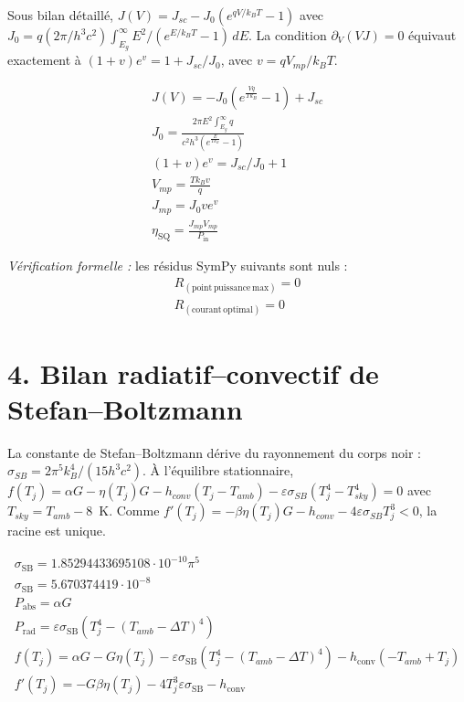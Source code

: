 \documentclass[11pt,a4paper,french]{article}
\begin{document}
Sous bilan détaillé, $J(V)=J_{sc}-J_0(e^{qV/k_BT}-1)$ avec $J_0=q(2\pi/h^3c^2)\int_{E_g}^{\infty}E^2/(e^{E/k_BT}-1)\,dE$. La condition $\partial_V(VJ)=0$ équivaut exactement à $(1+v)e^v=1+J_{sc}/J_0$, avec $v=qV_{mp}/k_BT$.

\begin{align}
J(V) = - J_0 \left(e^{\frac{V q}{T k_B}} - 1\right) + J_{sc} \\
J_0 = \frac{2 \pi E^{2} \int_{E_g}^{\infty} q}{c^{2} h^{3} \left(e^{\frac{E}{T k_B}} - 1\right)} \\
(1+v)e^v = J_{sc}/J_0 + 1 \\
V_{mp} = \frac{T k_B v}{q} \\
J_{mp} = J_0 v e^{v} \\
\eta_{\mathrm{SQ}} = \frac{J_{mp} V_{mp}}{P_{\mathrm{in}}}
\end{align}

\noindent\emph{Vérification formelle :} les résidus SymPy suivants sont nuls :
\begin{align}
R_{(\mathrm{point\, puissance\, max})} = 0 \\
R_{(\mathrm{courant\, optimal})} = 0
\end{align}

\section{4. Bilan radiatif--convectif de Stefan--Boltzmann}

La constante de Stefan--Boltzmann dérive du rayonnement du corps noir : $\sigma_{SB}=2\pi^5k_B^4/(15h^3c^2)$. À l'équilibre stationnaire, $f(T_j)=\alpha G-\eta(T_j)G-h_{conv}(T_j-T_{amb})-\varepsilon\sigma_{SB}(T_j^4-T_{sky}^4)=0$ avec $T_{sky}=T_{amb}-8$~K. Comme $f'(T_j)=-\beta\eta(T_j)G-h_{conv}-4\varepsilon\sigma_{SB}T_j^3<0$, la racine est unique.

\begin{align}
\sigma_{\mathrm{SB}} = 1.85294433695108 \cdot 10^{-10} \pi^{5} \\
\sigma_{\mathrm{SB}} = 5.670374419 \cdot 10^{-8} \\
P_{\mathrm{abs}} = \alpha G \\
P_{\mathrm{rad}} = \varepsilon \sigma_{\mathrm{SB}} \left(T_j^{4} - \left(T_{amb} - \Delta T\right)^{4}\right) \\
f{\left(T_j \right)} = \alpha G - G \eta(T_j) - \varepsilon \sigma_{\mathrm{SB}} \left(T_j^{4} - \left(T_{amb} - \Delta T\right)^{4}\right) - h_{\mathrm{conv}} \left(- T_{amb} + T_j\right) \\
f'(T_j) = - G \beta \eta(T_j) - 4 T_j^{3} \varepsilon \sigma_{\mathrm{SB}} - h_{\mathrm{conv}}
\end{align}
\end{document}
